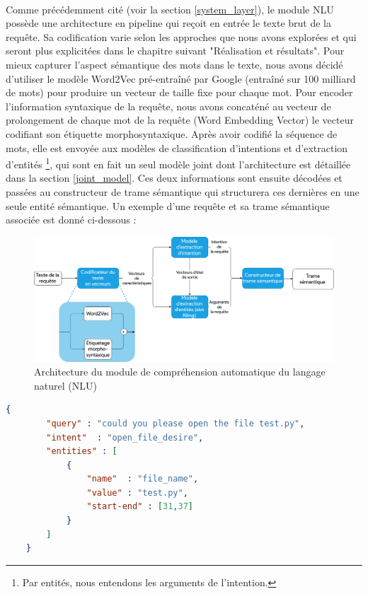 	\paragraph{}
	\label{encoding}
	Comme précédemment cité (voir la section \ref{system_layer}), le module NLU possède une architecture en pipeline qui reçoit en entrée le texte brut de la requête. Sa codification varie selon les approches que nous avons explorées et qui seront plus explicitées dans le chapitre suivant "Réalisation et résultats". Pour mieux capturer l'aspect sémantique des mots dans le texte, nous avons décidé d'utiliser le modèle Word2Vec pré-entraîné par Google (entraîné sur 100 milliard de mots) pour produire un vecteur de taille fixe pour chaque mot. Pour encoder l'information syntaxique de la requête, nous avons concaténé au vecteur de prolongement de chaque mot de la requête (Word Embedding Vector) le vecteur codifiant son étiquette morphosyntaxique. Après avoir codifié la séquence de mots, elle est envoyée aux modèles de classification d'intentions et d'extraction d'entités \footnote{Par entités, nous entendons les arguments de l'intention.}, qui sont en fait un seul modèle joint dont l'architecture est détaillée dans la section \ref{joint_model}. Ces deux informations sont ensuite décodées et passées au constructeur de trame sémantique qui structurera ces dernières en une seule entité sémantique. Un exemple d'une requête et sa trame sémantique associée est donné ci-dessous :
	\begin{figure}[h] 
		\label{nlu_arch}
		\centering
		\includegraphics[width=0.88\linewidth]{images/Conception/NLU/nlu_module_arch.png}
		\caption{Architecture du module de compréhension automatique du langage naturel (NLU)}
	\end{figure}
\newpage
	\begin{lstlisting}[language=json]
	{	
		"query"	: "could you please open the file test.py",
		"intent"  : "open_file_desire",
		"entities" : [
			{	
				"name"	: "file_name",
				"value"	: "test.py",
				"start-end"	: [31,37]
			}
		]
	}
	\end{lstlisting}
